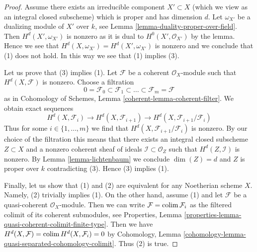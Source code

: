 \begin{proof}
Assume there exists an irreducible component $X' \subset X$ (which we view
as an integral closed subscheme) which is proper and has dimension $d$.
Let $\omega_{X'}$ be a dualizing module of $X'$ over $k$, see
Lemma \ref{lemma-duality-proper-over-field}. Then
$H^d(X', \omega_{X'})$ is nonzero as it is dual to $H^0(X', \mathcal{O}_{X'})$
by the lemma. Hence we see that $H^d(X, \omega_{X'}) = H^d(X', \omega_{X'})$
is nonzero and we conclude that (1) does not hold.
In this way we see that (1) implies (3).

\medskip\noindent
Let us prove that (3) implies (1).
Let $\mathcal{F}$ be a coherent $\mathcal{O}_X$-module such that
$H^d(X, \mathcal{F})$ is nonzero. Choose a filtration
$$
0 = \mathcal{F}_0 \subset \mathcal{F}_1 \subset
\ldots \subset \mathcal{F}_m = \mathcal{F}
$$
as in Cohomology of Schemes, Lemma \ref{coherent-lemma-coherent-filter}.
We obtain exact sequences
$$
H^d(X, \mathcal{F}_i) \to H^d(X, \mathcal{F}_{i + 1}) \to
H^d(X, \mathcal{F}_{i + 1}/\mathcal{F}_i)
$$
Thus for some $i \in \{1, \ldots, m\}$ we find that
$H^d(X, \mathcal{F}_{i + 1}/\mathcal{F}_i)$ is nonzero.
By our choice of the filtration this means that there exists
an integral closed subscheme $Z \subset X$
and a nonzero coherent sheaf of ideals $\mathcal{I} \subset \mathcal{O}_Z$
such that $H^d(Z, \mathcal{I})$ is nonzero.
By Lemma \ref{lemma-lichtenbaum}
we conclude $\dim(Z) = d$ and $Z$ is proper over $k$
contradicting (3). Hence (3) implies (1).

\medskip\noindent
Finally, let us show that (1) and (2) are equivalent for any Noetherian scheme
$X$. Namely, (2) trivially implies (1). On the other hand, assume (1) and
let $\mathcal{F}$ be a quasi-coherent $\mathcal{O}_X$-module. Then we can write
$\mathcal{F} = \mathop{\mathrm{colim}}\nolimits \mathcal{F}_i$ as the filtered colimit of its coherent
submodules, see
Properties, Lemma \ref{properties-lemma-quasi-coherent-colimit-finite-type}.
Then we have $H^d(X, \mathcal{F}) = \mathop{\mathrm{colim}}\nolimits H^d(X, \mathcal{F}_i) = 0$
by Cohomology, Lemma \ref{cohomology-lemma-quasi-separated-cohomology-colimit}.
Thus (2) is true.
\end{proof}












